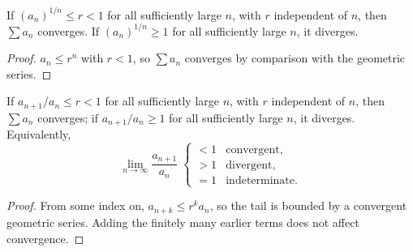 \begin{theorem}
If $(a_n)^{1/n}\le r<1$ for all sufficiently large $n$, with $r$ independent of $n$, then $\sum a_n$ converges. If $(a_n)^{1/n}\ge1$ for all sufficiently large $n$, it diverges.
\end{theorem}
\begin{proof}
$a_n\le r^n$ with $r<1$, so $\sum a_n$ converges by comparison with the geometric series.
\end{proof}

\begin{theorem}
If $a_{n+1}/a_n\le r<1$ for all sufficiently large $n$, with $r$ independent of $n$, then $\sum a_n$ converges; if $a_{n+1}/a_n\ge1$ for all sufficiently large $n$, it diverges. Equivalently,
\[
    \lim_{n\to\infty}\frac{a_{n+1}}{a_n} \;\begin{cases} <1 & \text{convergent},\\ >1 & \text{divergent},\\ =1 & \text{indeterminate}.\end{cases}
\]
\end{theorem}
\begin{proof}
From some index on, $a_{n+k}\le r^k a_n$, so the tail is bounded by a convergent geometric series. Adding the finitely many earlier terms does not affect convergence.
\end{proof}
